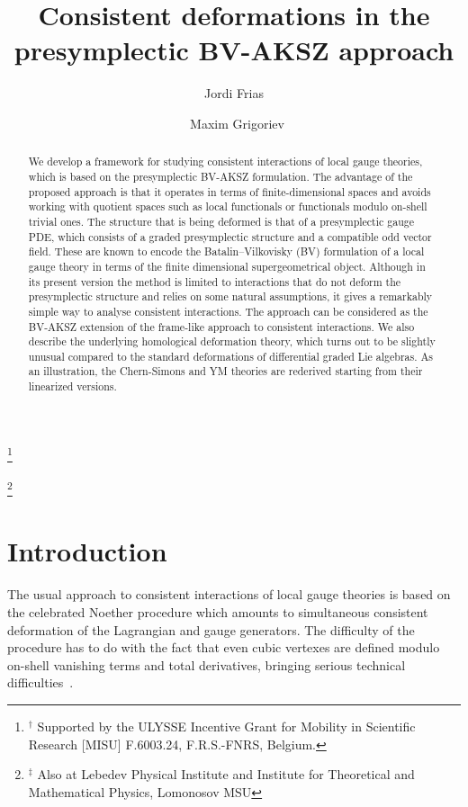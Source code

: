 \documentclass[a4paper,12pt]{article}
\title{Consistent deformations in the presymplectic BV-AKSZ approach}
\author[1]{Jordi Frias}
\author[2,$\dagger$,$\ddagger$]{~Maxim Grigoriev }
\affil[1]{\textsl{ Institute for Theoretical and Mathematical Physics,\protect\\
  Lomonosov Moscow State University, 119991 Moscow, Russia  \vspace{5pt}}}
\affil[2]{\textsl{Service de Physique de l'Univers, Champs et Gravitation, \protect\\ Universit\'e de Mons, 20 place du Parc, 7000 Mons, 
Belgium \vspace{5pt}}}
\date{}
\numberwithin{equation}{section} %
\newcommand\blfootnote[1]{%
  \begingroup
  \renewcommand\thefootnote{}\footnote{#1}%
  \addtocounter{footnote}{-1}%
  \endgroup
}
\begin{document}
\maketitle

\begin{abstract}
We develop a framework for studying consistent interactions of local gauge theories, which is based on the presymplectic BV-AKSZ formulation. The advantage of the proposed approach is that it operates in terms of finite-dimensional spaces and avoids working with quotient spaces such as local functionals or functionals modulo on-shell trivial ones. The structure that is being deformed is that of a presymplectic gauge PDE, which consists of a graded presymplectic structure and a compatible odd vector field. These are known to encode the Batalin--Vilkovisky (BV) formulation of a local gauge theory in terms of the finite dimensional supergeometrical object. Although in its present version the method is limited to interactions that do not deform the presymplectic structure and relies on some natural assumptions, it gives a remarkably simple way to analyse consistent interactions. The approach can be considered as the BV-AKSZ extension of the frame-like approach to consistent interactions. We also describe the underlying homological deformation theory, which turns out to be slightly unusual compared to the standard deformations of differential graded Lie algebras. As an illustration, the Chern-Simons and YM theories are rederived starting from their linearized versions.
\end{abstract}

    
\blfootnote{${}^{\dagger}$ Supported by the ULYSSE Incentive
Grant for Mobility in Scientific Research [MISU] F.6003.24, F.R.S.-FNRS, Belgium.}

\blfootnote{${}^{\ddagger}$ Also at Lebedev Physical Institute and Institute for Theoretical and Mathematical Physics, Lomonosov MSU}

\newpage



\tableofcontents

\section{Introduction}
The usual approach to consistent interactions of local gauge theories is based on the celebrated Noether procedure which amounts to simultaneous consistent deformation of the Lagrangian and gauge generators. The difficulty of the procedure has to do with the fact that even cubic vertexes are defined modulo on-shell vanishing terms  and total derivatives, bringing serious technical difficulties~\cite{Berends:1984rq}.
\end{document}
